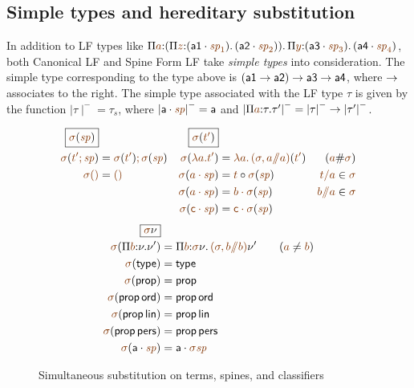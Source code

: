 \subsection{Simple types and hereditary substitution}
\label{sec:lf-simpletypesandhsubst}

In addition to LF types like $\lfpi{a}{(\lfpi{z}{(\lfroot{\sf
      a1}{\spi_1})}{\,(\lfroot{\sf
      a2}{\spi_2})})}{\,\lfpi{y}{(\lfroot{\sf
      a3}{\spi_3})}{\,(\lfroot{\sf a4}{\spi_4})}}$, both Canonical LF
and Spine Form LF take {\it simple types} into consideration. The
simple type corresponding to the type above is $({\sf a1} \rightarrow {\sf
  a2}) \rightarrow {\sf a3} \rightarrow {\sf a4}$, where ${\rightarrow}$
associates to the right. The simple type associated with the 
LF type
$\tau$ is given by the function ${\mid}\tau{\mid}^- = \tau_s$, where
${\mid}\lfroot{\sf a}{\spi}{\mid}^- = {\sf a}$ and
${\mid}\lfpi{a}{\tau}{\tau'}{\mid}^- = {\mid}\tau{\mid}^- \simplearrow
{\mid}\tau'{\mid}^-$. 


\begin{figure}
\begin{align*}
\fbox{$\lf{\sigma}(\lf{\spi})$}&
&
\fbox{$\lf{\sigma}(\lf{t'})$}
\\
\lf{\sigma}(\lf{t'; \spi}) 
 & = \lf{\no{\lf{\sigma}(\lf{t'})}; \no{\lf{\sigma}(\lf{\spi})}} &
\lf{\sigma}(\lf{\lambda a.t'}) 
 & = \lf{\lambda a.\,\no{\lf{(\sigma, a/\!\!/a)}(\lf{t'})}}
 & (\lf{a} \# \lf{\sigma})
\\
\lf{\sigma}\lfnil 
 & = \lfnil &
\lf{\sigma}(\lf{\lfroot{a}{\spi}}) 
 & = \subst{\lf t}{\no{\lf{\sigma}(\lf{\spi})}}
      & \lf{t/a} \in \lf{\sigma} 
\\
& &
\lf{\sigma}(\lf{\lfroot{a}{\spi}}) 
 & = \lf{\lfroot{b}{\no{\lf{\sigma}(\lf{\spi})}}} 
      & \lf{b/\!\!/a} \in \lf{\sigma} 
\\
& &
\lf{\sigma}(\lf{\lfroot{\sf c}{\spi}}) 
 & = \lf{\lfroot{\sf c}{\no{\lf{\sigma}(\lf{\spi})}}} 
\end{align*}\begin{align*}
\fbox{$\lf{\sigma}{\nu}$} &
\\
\lf{\sigma}(\lfpi{b}{\nu}{\nu'})
 & = \lfpi{b}{\lf{\sigma}\nu}{\,\lf{(\sigma, b/\!\!/b)}\nu'}
     \qquad (\lf a \neq \lf b) 
\\
\lf{\sigma}({\sf type})
  & = {\sf type}
\\ 
\lf{\sigma}({\sf prop}) 
 & = {\sf prop} 
\\
\lf{\sigma}({\sf prop}\,{\sf ord}) 
 & = {\sf prop}\,{\sf ord} 
\\
\lf{\sigma}({\sf prop}\,{\sf lin}) 
 & = {\sf prop}\,{\sf lin} 
\\
\lf{\sigma}({\sf prop}\,{\sf pers}) 
 & = {\sf prop}\,{\sf pers} 
\\
\lf{\sigma}(\lfroot{\sf a}{\spi}) 
 & = \lfroot{\sf a}{{\lf{\sigma\spi}}}
\end{align*}
\caption{Simultaneous substitution on terms, spines, and classifiers}
\label{fig:simsubst}
\end{figure}

